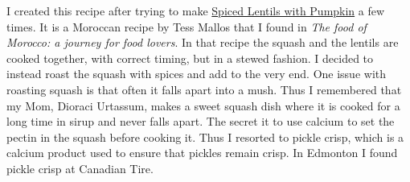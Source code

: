 \documentclass[11pt,letterpaper]{article}
\begin{document}


I created this recipe after trying to make \href{SpicedLentilsWithPumpkin.html}{Spiced Lentils with Pumpkin} a few times. It is a Moroccan recipe by Tess Mallos that I found in {\it The food of Morocco: a journey for food lovers}. In that recipe the squash and the lentils are cooked together, with correct timing, but in a stewed fashion.  I decided to instead roast the squash with spices and add to the very end. One issue with roasting squash is that often it falls apart into a mush. Thus I remembered that my Mom, Dioraci Urtassum, makes a sweet squash dish where it is cooked for a long time in sirup and never falls apart. The secret it to use calcium to set the pectin in the squash before cooking it. Thus I resorted to pickle crisp, which is a calcium product used to ensure that pickles remain crisp. In Edmonton I found pickle crisp at Canadian Tire.
\end{document}
